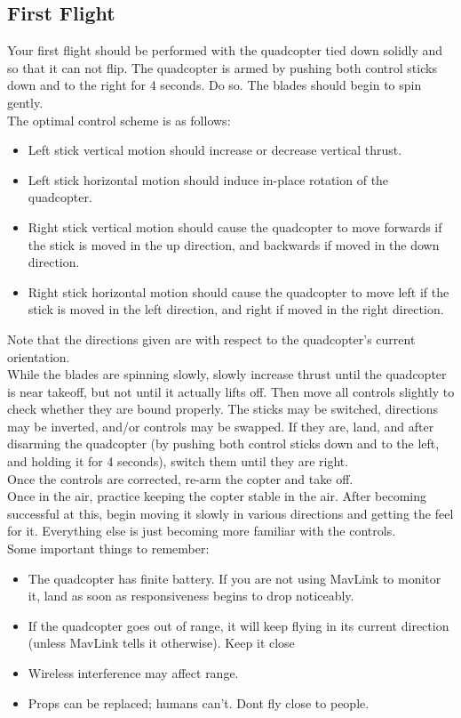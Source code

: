 \documentclass{article}
\begin{document}
\subsection{First Flight}
Your first flight should be performed with the quadcopter tied down solidly and so that it can not flip. The quadcopter is armed by pushing both control sticks down and to the right for 4 seconds. Do so. The blades should begin to spin gently.\\
\indent The optimal control scheme is as follows:
\begin{itemize}
\item Left stick vertical motion should increase or decrease vertical thrust.\\
\item Left stick horizontal motion should induce in-place rotation of the quadcopter.\\
\item Right stick vertical motion should cause the quadcopter to move forwards if the stick is moved in the up direction, and backwards if moved in the down direction.\\
\item Right stick horizontal motion should cause the quadcopter to move left if the stick is moved in the left direction, and right if moved in the right direction.\\
\end{itemize}
Note that the directions given are with respect to the quadcopter's current orientation.\\
\indent While the blades are spinning slowly, slowly increase thrust until the quadcopter is near takeoff, but not until it actually lifts off. Then move all controls slightly to check whether they are bound properly. The sticks may be switched, directions may be inverted, and/or controls may be swapped. If they are, land, and after disarming the quadcopter (by pushing both control sticks down and to the left, and holding it for 4 seconds), switch them until they are right.\\
\indent Once the controls are corrected, re-arm the copter and take off.\\
\indent Once in the air, practice keeping the copter stable in the air. After becoming successful at this, begin moving it slowly in various directions and getting the feel for it. Everything else is just becoming more familiar with the controls.\\
Some important things to remember:
\begin{itemize}
	\item The quadcopter has finite battery. If you are not using MavLink to monitor it, land as soon as responsiveness begins to drop noticeably.
	\item If the quadcopter goes out of range, it will keep flying in its current direction (unless MavLink tells it otherwise). Keep it close
	\item Wireless interference may affect range.
	\item Props can be replaced; humans can't. Dont fly close to people.
\end{itemize}
\end{document}
